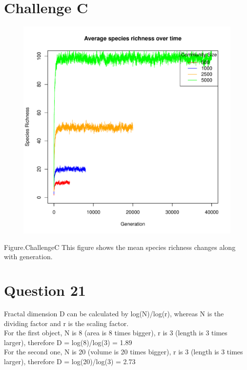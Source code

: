\documentclass[12pt,a4paper]{article}
\begin{document}
\section{Challenge C}
\begin{figure}[h]
\centering
\includegraphics[width=\textwidth]{challengeC.pdf}
\end{figure}
Figure.ChallengeC This figure shows the mean species richness changes along with generation.



\newpage
\section{Question 21}
Fractal dimension D can be calculated by log(N)/log(r), whereas N is the dividing factor and r is the scaling factor.
\\
For the first object, N is 8 (area is 8 times bigger), r is 3 (length is 3 times larger), therefore D = log(8)/log(3) = 1.89
\\
For the second one, N is 20 (volume is 20 times bigger), r is 3 (length is 3 times larger), therefore D = log(20)/log(3) = 2.73
\newpage
\end{document}
